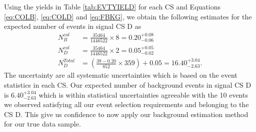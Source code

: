 \paragraph*{}\mbox{}\\
Using the yields in Table \ref{tab:EVTYIELD} for each CS and Equations \ref{eq:COLB}, \ref{eq:COLD} and \ref{eq:FBKG}, we obtain the following estimates for the expected number of events in signal CS \textsf{D} as
\begin{align*} 
 N_{B}^{col} &= \frac{35464}{1446522} \times 8 = 0.20^{+0.08}_{-0.06} \\
 N_{D}^{col} &= \frac{35464}{1446522} \times 2 = 0.05^{+0.05}_{-0.02} \\
 N_{D}^{Total} &= \left( \frac{39 - 0.20}{852}\times 359\right) +  0.05 = 16.40^{+3.04}_{-2.63}.
\end{align*}
The uncertainty are all systematic uncertainties which is based on the event statistics in each CS. Our expected number of background events in signal CS \textsf{D} is $6.40^{+3.04}_{-2.63}$  which is within statistical uncertainties agreeable with the 10 events we observed satisfying all our event selection requirements and belonging to the CS \textsf{D}. 
This give us confidence to now apply our background estimation method for our true data sample.
